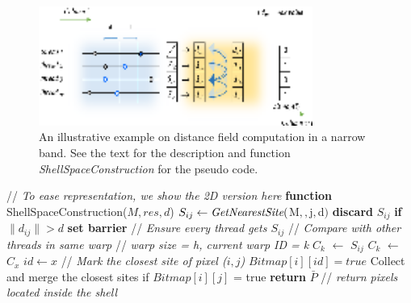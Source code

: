    \begin{figure}[ht]
  \centerline{\includegraphics[width=0.8\textwidth]{figs/gcvt/distanceField2}}
  \vspace{-0.1in}
  \caption{An illustrative example on distance field computation in a narrow band.
  See the text for the description and function \emph{ShellSpaceConstruction} for the pseudo code.
  }
  \label{fig:DF}
  \end{figure}

  \begin{algorithm}
  \label{ALGORITHM:shellspace}
  \begin{algorithmic}
  \State \textcolor[rgb]{0, 0.5, 0}{// \emph{To ease representation, we show the 2D version here}}
  \State \textbf{function} ShellSpaceConstruction($M, res, d$)
            \State $S_{ij} \leftarrow  \emph{GetNearestSite}($M$, $$, $j$, $d$)$
            \State \textbf{discard} $S_{ij}$ \textbf{if} $\parallel d_{ij} \parallel > d$
            \State \textbf{set barrier} \textcolor[rgb]{0.00,0.50,0.00}{// \emph{Ensure every thread gets $S_{ij}$}}
            \State \textcolor[rgb]{0.00,0.50,0.00}{// \emph{Compare with other threads in same warp}}
            \State \textcolor[rgb]{0.00,0.50,0.00}{// \emph{warp size = h, current warp ID = k}}
            \State $C_{k}$ $\gets$ $S_{ij}$ %
                        \State $C_{k}$ $\gets$ $C_{x}$
                        \State $id \gets x$
                \EndIf
            \EndFor
            \State \textcolor[rgb]{0.00,0.50,0.00}{// \emph{Mark the closest site of pixel ($i,j$) }}
            \State $Bitmap[i][id] = true$
        \EndFor
  \EndFor
  \State Collect and merge the closest sites if $Bitmap[i][j]$ = true
  \State \textbf{return} $\bar{P}$ \textcolor[rgb]{0.00,0.50,0.00}{// \emph{return pixels located inside the shell}}
  \end{algorithmic}
  \end{algorithm}


